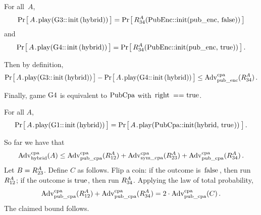 \begin{claim}
  For all~$A$,
  \[
    \Prob{A\code{.play(G3::init(hybrid))}} =
    \Prob{R_{\code{34}}^A(\code{PubEnc::init(pub_enc, false)})}
  \]
  and
  \[
    \Prob{A\code{.play(G4::init(hybrid))}} =
    \Prob{R_{\code{34}}^A(\code{PubEnc::init(pub_enc, true)})} \,.
  \]
\end{claim}
%
%
Then by definition,
%
\[
  \Prob{A\code{.play(G3::init(hybrid))}} -
  \Prob{A\code{.play(G4::init(hybrid))}} \leq
  \Adv{cpa}_\code{pub_enc}(R_{\code{34}}^A) \,.
\]

Finally, game $\code{G4}$ is equivalent to $\code{PubCpa}$ with $\code{right ==
true}$.
%
\begin{claim}
  For all $A$,
  \[
     \Prob{A\code{.play(G1::init(hybrid))}} =
     \Prob{A\code{.play(PubCpa::init(hybrid, true))}} \,.
  \]
\end{claim}
%

So far we have that
%
\[
  \Adv{cpa}_\code{hybrid}(A) \leq
    \Adv{cpa}_\code{pub_cpa}(R_{\code{12}}^A) +
    \Adv{cpa}_\code{sym_cpa}(R_{\code{23}}^A) +
    \Adv{cpa}_\code{pub_cpa}(R_{\code{34}}^A) \,.
\]
%
Let $B = R_{\code{23}}^A$.
%
Define $C$ as follows. Flip a coin: if the outcome is $\code{false}$, then run
$R_{\code{12}}^A$; if the outcome is $\code{true}$, then run $R_{\code{34}}^A$.
%
Applying the law of total probability,
%
%
\[
  \Adv{cpa}_\code{pub_cpa}(R_{\code{12}}^A) +
  \Adv{cpa}_\code{pub_cpa}(R_{\code{34}}^A)
  = 2\cdot \Adv{cpa}_\code{pub_cpa}(C) \,.
\]
%
The claimed bound follows.
